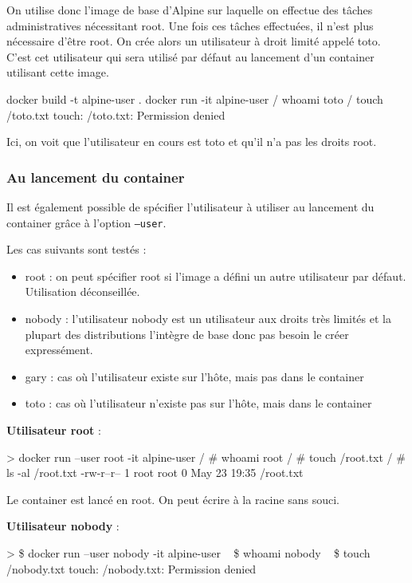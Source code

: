\documentclass[11pt,a4paper,oneside]{report}
\newcommand{\code}[1]{\texttt{#1}}
\begin{document}
On utilise donc l'image de base d'Alpine sur laquelle on effectue des tâches administratives nécessitant root. Une fois ces tâches effectuées, il n'est plus nécessaire d'être root. On crée alors un utilisateur à droit limité appelé toto. C'est cet utilisateur qui sera utilisé par défaut au lancement d'un container utilisant cette image.

\begin{textcode}
docker build -t alpine-user .
docker run -it alpine-user
/ whoami
toto
/ touch /toto.txt
touch: /toto.txt: Permission denied
\end{textcode}

Ici, on voit que l'utilisateur en cours est toto et qu'il n'a pas les droits root.

\subsubsection{Au lancement du container}
Il est également possible de spécifier l'utilisateur à utiliser au lancement du container grâce à l'option \code{--user}.

Les cas suivants sont testés :
\begin{itemize}
\item root : on peut spécifier root si l'image a défini un autre utilisateur par défaut. Utilisation déconseillée.
\item nobody : l'utilisateur nobody est un utilisateur aux droits très limités et la plupart des distributions l'intègre de base donc pas besoin le créer expressément.
\item gary : cas où l'utilisateur existe sur l'hôte, mais pas dans le container
\item toto : cas où l'utilisateur n'existe pas sur l'hôte, mais dans le container
\end{itemize}

\textbf{Utilisateur root} :
\begin{textcode}
> docker run --user root -it alpine-user
/ # whoami
root
/ # touch /root.txt
/ # ls -al /root.txt
-rw-r--r--    1 root     root             0 May 23 19:35 /root.txt
\end{textcode}

Le container est lancé en root. On peut écrire à la racine sans souci.

\textbf{Utilisateur nobody} :
\begin{textcode}
> \$ docker run --user nobody -it alpine-user
~ \$ whoami
nobody
~ \$ touch /nobody.txt
touch: /nobody.txt: Permission denied

\end{textcode}
\end{document}
